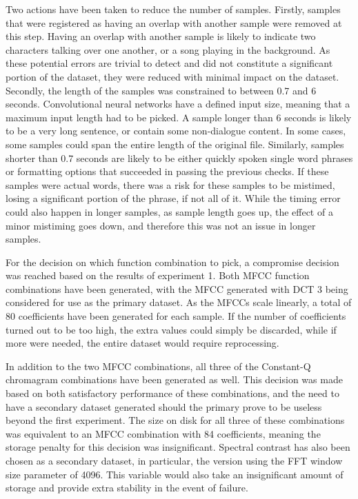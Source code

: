 Two actions have been taken to reduce the number of samples.
Firstly, samples that were registered as having an overlap with another sample were removed at this step.
Having an overlap with another sample is likely to indicate two characters talking over one another, or a song playing in the background.
As these potential errors are trivial to detect and did not constitute a significant portion of the dataset, they were reduced with minimal impact on the dataset.
Secondly, the length of the samples was constrained to between 0.7 and 6 seconds.
Convolutional neural networks have a defined input size, meaning that a maximum input length had to be picked.
A sample longer than 6 seconds is likely to be a very long sentence, or contain some non-dialogue content.
In some cases, some samples could span the entire length of the original file.
Similarly, samples shorter than 0.7 seconds are likely to be either quickly spoken single word phrases or formatting options that succeeded in passing the previous checks.
If these samples were actual words, there was a risk for these samples to be mistimed, losing a significant portion of the phrase, if not all of it.
While the timing error could also happen in longer samples, as sample length goes up, the effect of a minor mistiming goes down, and therefore this was not an issue in longer samples.

For the decision on which function combination to pick, a compromise decision was reached based on the results of experiment 1.
Both MFCC function combinations have been generated, with the MFCC generated with DCT 3 being considered for use as the primary dataset.
As the MFCCs scale linearly, a total of 80 coefficients have been generated for each sample.
If the number of coefficients turned out to be too high, the extra values could simply be discarded, while if more were needed, the entire dataset would require reprocessing.

In addition to the two MFCC combinations, all three of the Constant-Q chromagram combinations have been generated as well.
This decision was made based on both satisfactory performance of these combinations, and the need to have a secondary dataset generated should the primary prove to be useless beyond the first experiment.
The size on disk for all three of these combinations was equivalent to an MFCC combination with 84 coefficients, meaning the storage penalty for this decision was insignificant.
Spectral contrast has also been chosen as a secondary dataset, in particular, the version using the FFT window size parameter of 4096.
This variable would also take an insignificant amount of storage and provide extra stability in the event of failure.

